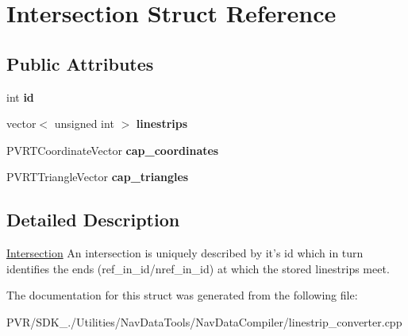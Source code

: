 \hypertarget{struct_intersection}{\section{Intersection Struct Reference}
\label{struct_intersection}
}
\subsection*{Public Attributes}
\begin{DoxyCompactItemize}
\item 
\hypertarget{struct_intersection_aeb9fca2bf608dcba12d23b3b6452c2a3}{int {\bfseries id}}\label{struct_intersection_aeb9fca2bf608dcba12d23b3b6452c2a3}

\item 
\hypertarget{struct_intersection_aea6c695fb6f3227a4d888ec1ee0d6c2f}{vector$<$ unsigned int $>$ {\bfseries linestrips}}\label{struct_intersection_aea6c695fb6f3227a4d888ec1ee0d6c2f}

\item 
\hypertarget{struct_intersection_a5fe81e7036a2c8cfa110740c7b0b5bc9}{P\+V\+R\+T\+Coordinate\+Vector {\bfseries cap\+\_\+coordinates}}\label{struct_intersection_a5fe81e7036a2c8cfa110740c7b0b5bc9}

\item 
\hypertarget{struct_intersection_a2463a536f650fd6ac89c656cfca5f313}{P\+V\+R\+T\+Triangle\+Vector {\bfseries cap\+\_\+triangles}}\label{struct_intersection_a2463a536f650fd6ac89c656cfca5f313}

\end{DoxyCompactItemize}


\subsection{Detailed Description}


  \hyperlink{struct_intersection}{Intersection}  An intersection is uniquely described by it's id which in turn identifies the ends (ref\+\_\+in\+\_\+id/nref\+\_\+in\+\_\+id) at which the stored linestrips meet. 

The documentation for this struct was generated from the following file\+:\begin{DoxyCompactItemize}
\item 
P\+V\+R/\+S\+D\+K\+\_./\+Utilities/\+Nav\+Data\+Tools/\+Nav\+Data\+Compiler/linestrip\+\_\+converter.\+cpp\end{DoxyCompactItemize}

